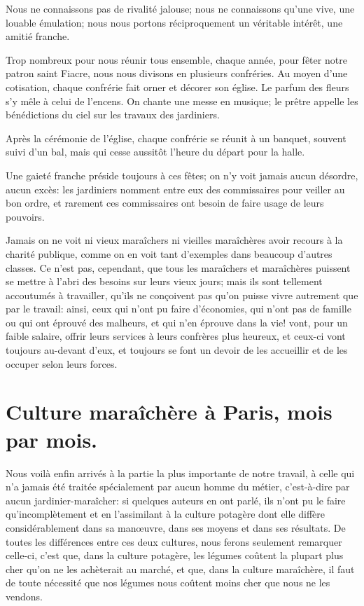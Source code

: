 \documentclass[10pt,a4paper]{book}
\begin{document}
Nous ne connaissons pas de rivalité jalouse; nous ne connaissons qu'une vive, une louable émulation; nous nous portons réciproquement un véritable intérêt, une amitié franche.

Trop nombreux pour nous réunir tous ensemble, chaque année, pour fêter notre patron saint Fiacre, nous nous divisons en plusieurs confréries. Au moyen d'une cotisation, chaque confrérie fait orner et décorer son église. Le parfum des fleurs s'y mêle à celui de l'encens. On chante une messe en musique; le prêtre appelle les bénédictions du ciel sur les travaux des jardiniers.

Après la cérémonie de l'église, chaque confrérie se réunit à un banquet, souvent suivi d'un bal, mais qui cesse aussitôt l'heure du départ pour la halle.

Une gaieté franche préside toujours à ces fêtes; on n'y voit jamais aucun désordre, aucun excès: les jardiniers nomment entre eux des commissaires pour veiller au bon ordre, et rarement ces commissaires ont besoin de faire usage de leurs pouvoirs.

Jamais on ne voit ni vieux maraîchers ni vieilles maraîchères avoir recours à la charité publique, comme on en voit tant d'exemples dans beaucoup d'autres classes. Ce n'est pas, cependant, que tous les maraîchers et maraîchères puissent se mettre à l'abri des besoins sur leurs vieux jours; mais ils sont tellement accoutumés à travailler, qu'ils ne conçoivent pas qu'on puisse vivre autrement que par le travail: ainsi, ceux qui n'ont pu faire d'économies, qui n'ont pas de famille ou qui ont éprouvé des malheurs, et qui n'en éprouve dans la vie! vont, pour un faible salaire, offrir leurs services à leurs confrères plus heureux, et ceux-ci vont toujours au-devant d'eux, et toujours se font un devoir de les accueillir et de les occuper selon leurs forces.

\chapter{Culture maraîchère à Paris, mois par mois.}\label{moisparmois}

Nous voilà enfin arrivés à la partie la plus importante de notre travail, à celle qui n'a jamais été traitée spécialement par aucun homme du métier, c'est-à-dire par aucun jardinier-maraîcher: si quelques auteurs en ont parlé, ils n'ont pu le faire qu'incomplètement et en l'assimilant à la culture potagère dont elle diffère considérablement dans sa manœuvre, dans ses moyens et dans ses résultats. De toutes les différences entre ces deux cultures, nous ferons seulement remarquer celle-ci, c'est que, dans la culture potagère, les légumes coûtent la plupart plus cher qu'on ne les achèterait au marché, et que, dans la culture maraîchère, il faut de toute nécessité que nos légumes nous coûtent moins cher que nous ne les vendons.
\end{document}
